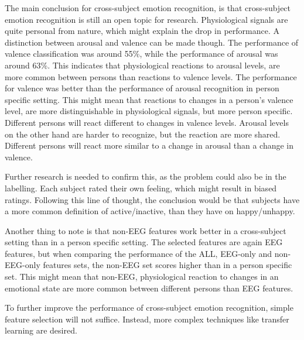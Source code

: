 The main conclusion for cross-subject emotion recognition, is that cross-subject emotion recognition is still an open topic for research. Physiological signals are quite personal from nature, which might explain the drop in performance. A distinction between arousal and valence can be made though. The performance of valence classification was around 55\%, while the performance of arousal was around 63\%. This indicates that physiological reactions to arousal levels, are more common between persons than reactions to valence levels. The performance for valence was better than the performance of arousal recognition in person specific setting. This might mean that reactions to changes in a person's valence level, are more distinguishable in physiological signals, but more person specific. Different persons will react different to changes in valence levels. Arousal levels on the other hand are harder to recognize, but the reaction are more shared. Different persons will react more similar to a change in arousal than a change in valence.

\npar

Further research is needed to confirm this, as the problem could also be in the labelling. Each subject rated their own feeling, which might result in biased ratings. Following this line of thought, the conclusion would be that subjects have a more common definition of active/inactive, than they have on happy/unhappy.

\npar

Another thing to note is that non-EEG features work better in a cross-subject setting than in a person specific setting. The selected features are again EEG features, but when comparing the performance of the ALL, EEG-only and non-EEG-only features sets, the non-EEG set scores higher than in a person specific set. This might mean that non-EEG, physiological reaction to changes in an emotional state are more common between different persons than EEG features.

\npar

To further improve the performance of cross-subject emotion recognition, simple feature selection will not suffice. Instead, more complex techniques like transfer learning are desired. 